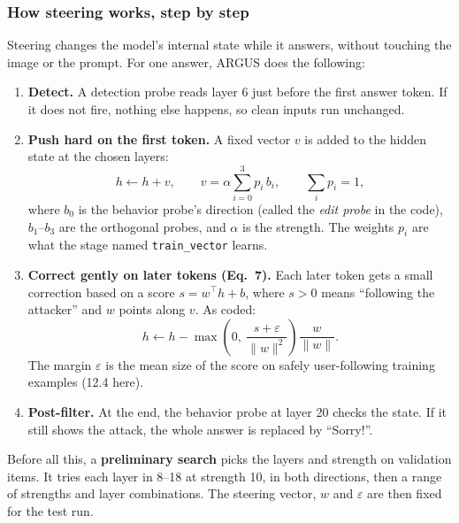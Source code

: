 \documentclass[11pt,a4paper]{article}
\newcommand{\code}[1]{\texttt{#1}}
\begin{document}
\subsubsection{How steering works, step by step}
Steering changes the model's internal state while it answers, without touching the image or the prompt. For one answer, ARGUS does the following:
\begin{enumerate}
\item \textbf{Detect.} A detection probe reads layer 6 just before the first answer token. If it does not fire, nothing else happens, so clean inputs run unchanged.
\item \textbf{Push hard on the first token.} A fixed vector $v$ is added to the hidden state at the chosen layers:
\[ h \leftarrow h + v, \qquad v = \alpha \sum_{i=0}^{3} p_i\, b_i, \qquad \sum_i p_i = 1, \]
where $b_0$ is the behavior probe's direction (called the \emph{edit probe} in the code), $b_1$--$b_3$ are the orthogonal probes, and $\alpha$ is the strength. The weights $p_i$ are what the stage named \code{train\_vector} learns.
\item \textbf{Correct gently on later tokens (Eq.~7).} Each later token gets a small correction based on a score $s = w^\top h + b$, where $s>0$ means ``following the attacker'' and $w$ points along $v$. As coded:
\[ h \leftarrow h - \max\!\left(0,\ \frac{s+\varepsilon}{\lVert w\rVert^2}\right)\frac{w}{\lVert w\rVert}. \]
The margin $\varepsilon$ is the mean size of the score on safely user-following training examples (12.4 here).
\item \textbf{Post-filter.} At the end, the behavior probe at layer 20 checks the state. If it still shows the attack, the whole answer is replaced by ``Sorry!''.
\end{enumerate}
Before all this, a \textbf{preliminary search} picks the layers and strength on validation items. It tries each layer in 8--18 at strength 10, in both directions, then a range of strengths and layer combinations. The steering vector, $w$ and $\varepsilon$ are then fixed for the test run.
\end{document}
